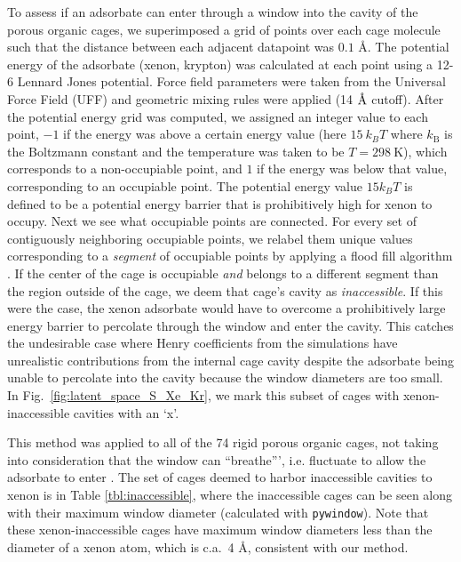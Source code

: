 \documentclass[journal=jacsat,manuscript=article]{achemso}
\newcommand{\angstrom}{\mbox{\normalfont\AA}}
\begin{document}
To assess if an adsorbate can enter through a window into the cavity of the porous organic cages, we superimposed a grid of points over each cage molecule such that the distance between each adjacent datapoint was $0.1$ \AA. The potential energy of the adsorbate (xenon, krypton) was calculated at each point using a 12-6 Lennard Jones potential. Force field parameters were taken from the Universal Force Field (UFF) and geometric mixing rules were applied (14 $\angstrom$ cutoff). After the potential energy grid was computed, we assigned an integer value to each point, $-1$ if the energy was above a certain energy value (here $15 \ k_BT$ where $k_\text{B}$ is the Boltzmann constant and the temperature was taken to be $T = 298 \ \text{K}$), which corresponds to a non-occupiable point, and $1$ if the energy was below that value, corresponding to an occupiable point. The potential energy value $15k_B T$ is defined to be a potential energy barrier that is prohibitively high for xenon to occupy\cite{kim2012high}.
Next we see what occupiable points are connected. For every set of contiguously neighboring occupiable points, we relabel them unique values corresponding to a \emph{segment} of occupiable points by applying a flood fill algorithm \cite{martin2012accelerating,kim2012high}. If the center of the cage is occupiable \emph{and} belongs to a different segment than the region outside of the cage, we deem that cage's cavity as \emph{inaccessible}. If this were the case, the xenon adsorbate would have to overcome a prohibitively large energy barrier to percolate through the window and enter the cavity. This catches the undesirable case where Henry coefficients from the simulations have unrealistic contributions from the internal cage cavity despite the adsorbate being unable to percolate into the cavity because the window diameters are too small. In Fig.~\ref{fig:latent_space_S_Xe_Kr}, we mark this subset of cages with xenon-inaccessible cavities with an `x'.

This method was applied to all of the 74 rigid porous organic cages, not taking into consideration that the window can ``breathe''', i.e. fluctuate to allow the adsorbate to enter \cite{miklitz2017computational}. The set of cages deemed to harbor inaccessible cavities to xenon is in Table \ref{tbl:inaccessible}, where the inaccessible cages can be seen along with their maximum window diameter (calculated with \texttt{pywindow}). Note that these xenon-inaccessible cages have maximum window diameters less than the diameter of a xenon atom, which is c.a.\ 4 \AA, consistent with our method. 
\end{document}
